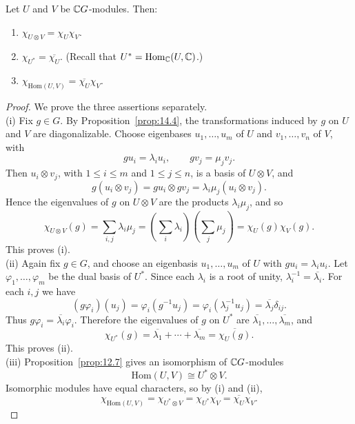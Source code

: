 \documentclass[../Odyssey_Project.tex]{subfiles}
\begin{document}
\begin{proposition}
\label{prop:14.8}
Let $U$ and $V$ be $\mathbb{C} G$-modules. Then:
\begin{enumerate}
    \item[(i)] $\chi_{U \otimes V} = \chi_U \chi_V$.
    \item[(ii)] $\chi_{U^*} = \overline{\chi_U}$. (Recall that $U^* = \mathrm{Hom}_{\mathbb{C}}(U, \mathbb{C})$.)
    \item[(iii)] $\chi_{\mathrm{Hom}(U,V)} = \overline{\chi_U} \chi_V$.
\end{enumerate}
\end{proposition}
\begin{proof}
    We prove the three assertions separately.\\
    (i) Fix $g \in G$. By Proposition~\ref{prop:14.4}, the transformations induced by $g$ on $U$ and $V$ are diagonalizable. Choose eigenbases $u_1,\ldots,u_m$ of $U$ and $v_1,\ldots,v_n$ of $V$, with
    \[
        gu_i=\lambda_i u_i,
        \qquad
        gv_j=\mu_j v_j.
    \]
    Then $u_i \otimes v_j$, with $1 \leq i \leq m$ and $1 \leq j \leq n$, is a basis of $U \otimes V$, and
    \[
        g(u_i \otimes v_j)=gu_i \otimes gv_j
        =
        \lambda_i\mu_j(u_i \otimes v_j).
    \]
    Hence the eigenvalues of $g$ on $U \otimes V$ are the products $\lambda_i\mu_j$, and so
    \[
        \chi_{U \otimes V}(g)
        =
        \sum_{i,j}\lambda_i\mu_j
        =
        \left(\sum_i\lambda_i\right)\left(\sum_j\mu_j\right)
        =
        \chi_U(g)\chi_V(g).
    \]
    This proves (i).\\
    (ii) Again fix $g \in G$, and choose an eigenbasis $u_1,\ldots,u_m$ of $U$ with $gu_i=\lambda_i u_i$. Let $\varphi_1,\ldots,\varphi_m$ be the dual basis of $U^*$. Since each $\lambda_i$ is a root of unity, $\lambda_i^{-1}=\overline{\lambda_i}$. For each $i,j$ we have
    \[
        (g\varphi_i)(u_j)
        =
        \varphi_i(g^{-1}u_j)
        =
        \varphi_i(\lambda_j^{-1}u_j)
        =
        \overline{\lambda_j}\delta_{ij}.
    \]
    Thus $g\varphi_i=\overline{\lambda_i}\varphi_i$. Therefore the eigenvalues of $g$ on $U^*$ are $\overline{\lambda_1},\ldots,\overline{\lambda_m}$, and
    \[
        \chi_{U^*}(g)=\overline{\lambda_1}+\cdots+\overline{\lambda_m}
        =
        \overline{\chi_U(g)}.
    \]
    This proves (ii).\\
    (iii) Proposition~\ref{prop:12.7} gives an isomorphism of $\mathbb{C} G$-modules
    \[
        \mathrm{Hom}(U,V) \cong U^* \otimes V.
    \]
    Isomorphic modules have equal characters, so by (i) and (ii),
    \[
        \chi_{\mathrm{Hom}(U,V)}
        =
        \chi_{U^* \otimes V}
        =
        \chi_{U^*}\chi_V
        =
        \overline{\chi_U}\chi_V.
    \]
\end{proof}
\end{document}
